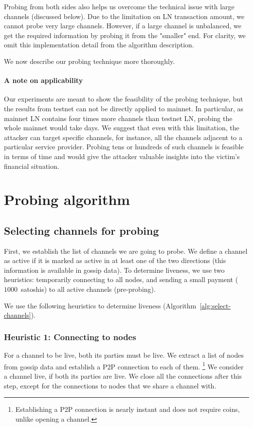 Probing from both sides also helps us overcome the technical issue with large channels (discussed below).
Due to the limitation on LN transaction amount, we cannot probe very large channels.
However, if a large channel is unbalanced, we get the required information by probing it from the "smaller" end.
For clarity, we omit this implementation detail from the algorithm description.

We now describe our probing technique more thoroughly.

\paragraph{A note on applicability}

Our experiments are meant to show the feasibility of the probing technique, but the results from testnet can not be directly applied to mainnet.
In particular, as mainnet LN contains four times more channels than testnet LN, probing the whole mainnet would take days.
We suggest that even with this limitation, the attacker can target specific channels, for instance, all the channels adjacent to a particular service provider.
Probing tens or hundreds of such channels is feasible in terms of time and would give the attacker valuable insights into the victim's financial situation.


\section{Probing algorithm}

\subsection{Selecting channels for probing}
First, we establish the list of channels we are going to probe.
We define a channel as active if it is marked as active in at least one of the two directions (this information is available in gossip data).
To determine liveness, we use two heuristics: temporarily connecting to all nodes, and sending a small payment ($1000$~satoshis) to all active channels (pre-probing).

We use the following heuristics to determine liveness (Algorithm~\ref{alg:select-channels}).

\subsubsection*{Heuristic 1: Connecting to nodes}
For a channel to be live, both its parties must be live.
We extract a list of nodes from gossip data and establish a P2P connection to each of them.
\footnote{Establishing a P2P connection is nearly instant and does not require coins, unlike opening a channel.}
We consider a channel live, if both its parties are live.
We close all the connections after this step, except for the connections to nodes that we share a channel with.

